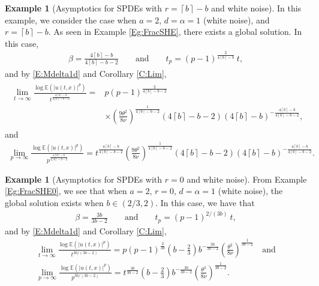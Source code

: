 \documentclass[12pt]{report}
\theoremstyle{plain}
\theoremstyle{definition}
\newtheorem{example}[theorem]{Example}
\numberwithin{equation}{section}
\newcommand{\E}{\mathbb{E}}
\newcommand{\Ceil}[1]{\left\lceil #1 \right\rceil}
\begin{document}
\begin{example}[Asymptotics for SPDEs with $r=\Ceil{b}-b$ and white noise] \label{Eg:AsymFracSHE}
	In this example, we consider the case when $a=2$, $d=\alpha=1$ (white noise), and $r=\Ceil{b}-b$.
	As seen in Example \ref{Eg:FracSHE}, there exists a global solution. In this case,
	\begin{align*}
	\beta = \frac{4\Ceil{b}-b}{4\Ceil{b}-b-2} \qquad \text{and} \qquad
	t_p   = (p-1)^{\frac{2}{4\Ceil{b}-b}}\: t,
	\end{align*}
	and by \eqref{E:Mdelta1d} and Corollary \ref{C:Lim},
	\begin{align} \label{E:AsymFracSHE-t}
	\begin{aligned}
	\lim_{t \to \infty} \frac{\log \E\left(|u(t,x)|^p\right)}{t^{\frac{4\Ceil{b}-b}{4\Ceil{b}-b-2} }} =
	& p (p-1)^{\frac{2}{4\Ceil{b}-b-2}} \\
	& \times \left(\frac{9\theta^2}{8\nu}\right)^{\frac{1}{4 \Ceil{b}-b-2}} (4 \Ceil{b}-b-2) \left(4 \Ceil{b}-b\right)^{-\frac{4 \Ceil{b}-b}{4 \Ceil{b}-b-2}},
	\end{aligned}
	\end{align}
	and
	\begin{align} \label{E:AsymFracSHE-p}
	\lim_{p \to \infty} \frac{\log \E\left(|u(t,x)|^p\right)}{p^{\frac{4\Ceil{b}-b}{4\Ceil{b}-b-2} }}
	= t^{\frac{4\Ceil{b}-b}{4\Ceil{b}-b-2}}
	\left(\frac{9\theta^2}{8\nu}\right)^{\frac{1}{4 \Ceil{b}-b-2}} (4 \Ceil{b}-b-2) \left(4 \Ceil{b}-b\right)^{-\frac{4 \Ceil{b}-b}{4 \Ceil{b}-b-2}}.
	\end{align}
\end{example}

\begin{example}[Asymptotics for SPDEs with $r=0$ and white noise] \label{Eg:AymsFracSHE0}
	From Example \ref{Eg:FracSHE0}, we see that when $a=2$, $r=0$, $d=\alpha=1$ (white noise), the
	global solution exists when  $b\in (2 /3, 2)$. In this case, we have that
	\begin{align*}
	\beta = \frac{3b}{3b-2} \qquad \text{and} \qquad
	t_p   = (p-1)^{2 / (3b)}\: t,
	\end{align*}
	and by \eqref{E:Mdelta1d} and Corollary \ref{C:Lim},
	\begin{gather} \label{E:AsymFracSHE-t}
	\lim_{t \to \infty} \frac{\log \E\left(|u(t,x)|^p\right)}{t^{3b/(3b-2)}} =
	p (p-1)^{\frac{2}{3b}} \left(b-\frac{2}{3}\right) b^{-\frac{3 b}{3 b-2}} \left(\frac{\theta^2}{8\nu}\right)^{\frac{1}{3 b-2}}
	\quad \text{and}\\
	\label{E:AsymFracSHE-p}
	\lim_{p \to \infty} \frac{\log \E\left(|u(t,x)|^p\right)}{p^{3b/(3b-2)}} =
	t^{\frac{3b}{3b-2}}
	\left(b-\frac{2}{3}\right) b^{-\frac{3 b}{3 b-2}} \left(\frac{\theta^2}{8\nu}\right)^{\frac{1}{3 b-2}}.
	\end{gather}
\end{example}
\end{document}
